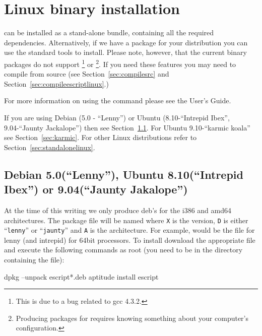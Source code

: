 %
%
%

\section{Linux binary installation}
\label{sec:binlinux}

\esfinley can be installed as a stand-alone bundle, containing all the required dependencies.
Alternatively, if we have a package for your distribution you can use the standard tools to install.
Please note, however, that the current binary packages do not support \openmp\footnote{This is due to a bug related to gcc 4.3.2.} or \mpi\footnote{Producing packages for \mpi requires knowing something about your computer's configuration.}.
If you need these features you may need to compile \esfinley from source (see Section~\ref{sec:compilesrc} and Section~\ref{sec:compileescriptlinux}.)

For more information on using the  command please see the User's Guide.

If you are using Debian (5.0 - ``Lenny'') or Ubuntu (8.10-``Intrepid Ibex'', 9.04-``Jaunty Jackalope'') then see Section~\ref{sec:debian}.
For Ubuntu 9.10-``karmic koala'' see Section~\ref{sec:karmic}.
For other Linux distributions refer to Section~\ref{sec:standalonelinux}.

\subsection{Debian 5.0(``Lenny''), Ubuntu 8.10(``Intrepid Ibex'') or 9.04(``Jaunty Jakalope'')}\label{sec:debian}

At the time of this writing we only produce deb's for the i386 and amd64 architectures.
The package file will be named  where \texttt{X} is the version, \texttt{D} is either ``\texttt{lenny}'' or ``\texttt{jaunty}'' and \texttt{A} is the architecture.
For example,  would be the file for lenny (and intrepid) for 64bit processors.
To install \esfinley download the appropriate  file and execute the following commands as root (you need to be in the directory containing the file):
\begin{shellCode}
dpkg --unpack escript*.deb
aptitude install escript
\end{shellCode}

